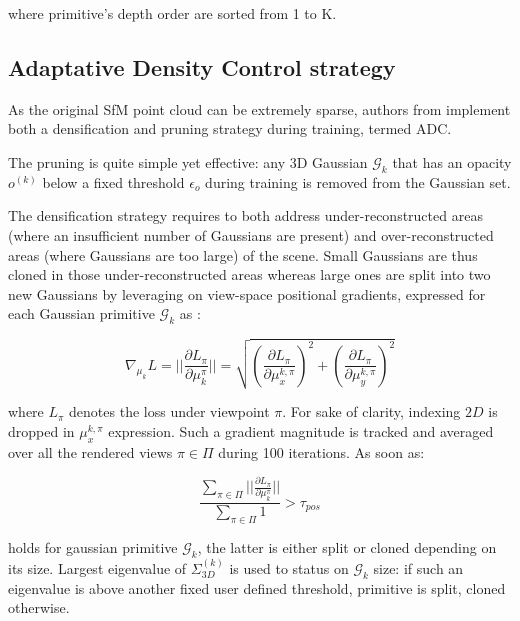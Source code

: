 \noindent where primitive’s depth order are sorted from 1 to K. \newline

\subsection{Adaptative Density Control strategy} 
As the original \ac{SfM} point cloud can be extremely sparse, authors from \citep{kerbl20233d} implement both a densification and pruning strategy during training, termed \ac{ADC}. 

The pruning is quite simple yet effective: any 3D Gaussian $\mathcal{G}_{k}$ that has an opacity $o^{(k)}$ below a fixed threshold $\epsilon_{o}$ during training is removed from the Gaussian set. 

The densification strategy requires to both address under-reconstructed areas (where an insufficient number of Gaussians are present) and over-reconstructed areas (where Gaussians are too large) of the scene. Small Gaussians are thus cloned in those under-reconstructed areas whereas large ones are split into two new Gaussians by leveraging on view-space positional gradients, expressed for each Gaussian primitive $\mathcal{G}_{k}$ as : 

\begin{equation}
   \nabla_{\mu_{k}}L= ||\frac{\partial L_{\pi}}{\partial \mu_{k}^{\pi}}|| = \sqrt{\left(\frac{\partial L_{\pi}}{\partial \mu_{x}^{k,\pi}}\right)^{2} + \left(\frac{\partial L_{\pi}}{\partial \mu_{y}^{k,\pi}}\right)^{2}}
\end{equation}

\noindent where $L_{\pi}$ denotes the loss under viewpoint $\pi$. For sake of clarity, indexing $2D$ is dropped in $\mu_{x}^{k,\pi}$ expression. Such a gradient magnitude is tracked and averaged over all the rendered views $\pi \in \Pi$ during 100 iterations. As soon as: 

\begin{equation}
\frac{\sum \limits_{\pi \in \Pi} ||\frac{\partial L_{\pi}}{\partial \mu_{k}^{\pi}}||}{\sum \limits_{\pi \in \Pi} 1} > \tau_{pos}
\label{eq:adc-original}
\end{equation}

\noindent holds for gaussian primitive $\mathcal{G}_{k}$, the latter is either split or cloned depending on its size. Largest eigenvalue of $\Sigma^{(k)}_{3D}$ is used to status on $\mathcal{G}_{k}$ size: if such an eigenvalue is above another fixed user defined threshold, primitive is split, cloned otherwise. \newline

